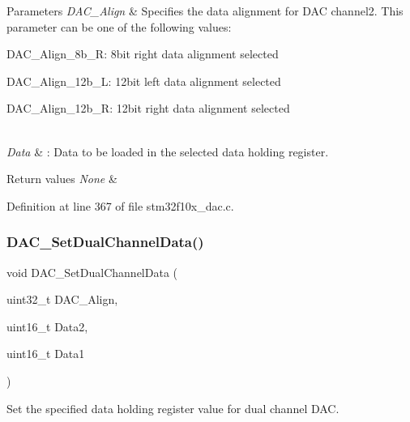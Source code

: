 \begin{DoxyParams}{Parameters}
{\em D\+A\+C\+\_\+\+Align} & Specifies the data alignment for D\+AC channel2. This parameter can be one of the following values\+: \begin{DoxyItemize}
\item D\+A\+C\+\_\+\+Align\+\_\+8b\+\_\+R\+: 8bit right data alignment selected \item D\+A\+C\+\_\+\+Align\+\_\+12b\+\_\+L\+: 12bit left data alignment selected \item D\+A\+C\+\_\+\+Align\+\_\+12b\+\_\+R\+: 12bit right data alignment selected \end{DoxyItemize}
\\
\hline
{\em Data} & \+: Data to be loaded in the selected data holding register. \\
\hline
\end{DoxyParams}

\begin{DoxyRetVals}{Return values}
{\em None} & \\
\hline
\end{DoxyRetVals}


Definition at line 367 of file stm32f10x\+\_\+dac.\+c.

\mbox{\label{group___d_a_c___exported___functions_ga4ca2cfdf56ab35a23f2517f23d7fbb24}} 
\subsubsection{\texorpdfstring{D\+A\+C\+\_\+\+Set\+Dual\+Channel\+Data()}{DAC\_SetDualChannelData()}}
{\footnotesize\ttfamily void D\+A\+C\+\_\+\+Set\+Dual\+Channel\+Data (\begin{DoxyParamCaption}\item[{uint32\+\_\+t}]{D\+A\+C\+\_\+\+Align,  }\item[{uint16\+\_\+t}]{Data2,  }\item[{uint16\+\_\+t}]{Data1 }\end{DoxyParamCaption})}



Set the specified data holding register value for dual channel D\+AC. 


